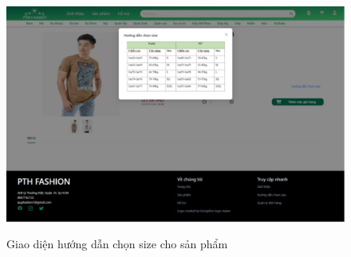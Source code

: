     \begin{figure}[!htp]
        \centering
        \includegraphics[width=5in]{img/UI/new_customer/guide_size.png}
        \label{10}
        \newline
        \caption{Giao diện hướng dẫn chọn size cho sản phẩm}
    \end{figure}
    \newpage
 
